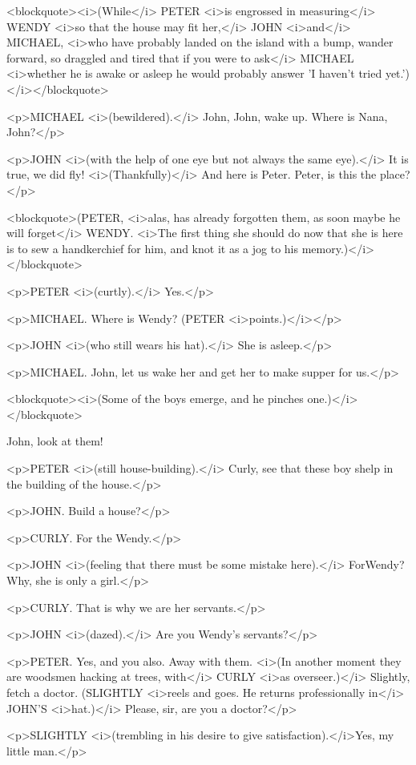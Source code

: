 <blockquote><i>(While</i> PETER <i>is engrossed in measuring</i>
WENDY <i>so that the house may fit her,</i> JOHN <i>and</i> MICHAEL,
<i>who have probably landed on the island with a bump, wander
forward, so draggled and tired that if you were to ask</i> MICHAEL
<i>whether he is awake or asleep he would probably answer 'I haven't
tried yet.')</i></blockquote>

<p>MICHAEL <i>(bewildered).</i> John, John, wake up. Where is Nana,
John?</p>

<p>JOHN <i>(with the help of one eye but not always the same
eye).</i> It is true, we did fly! <i>(Thankfully)</i> And here is
Peter. Peter, is this the place?</p>

<blockquote>(PETER, <i>alas, has already forgotten them, as soon
maybe he will forget</i> WENDY. <i>The first thing she should do now
that she is here is to sew a handkerchief for him, and knot it as a
jog to his memory.)</i></blockquote>

<p>PETER <i>(curtly).</i> Yes.</p>

<p>MICHAEL. Where is Wendy? (PETER <i>points.)</i></p>

<p>JOHN <i>(who still wears his hat).</i> She is asleep.</p>

<p>MICHAEL. John, let us wake her and get her to make supper for
us.</p>

<blockquote><i>(Some of the boys emerge, and he pinches
one.)</i></blockquote>

John, look at them! 

<p>PETER <i>(still house-building).</i> Curly, see that these boy
shelp in the building of the house.</p>

<p>JOHN. Build a house?</p>

<p>CURLY. For the Wendy.</p>

<p>JOHN <i>(feeling that there must be some mistake here).</i>
ForWendy? Why, she is only a girl.</p>

<p>CURLY. That is why we are her servants.</p>

<p>JOHN <i>(dazed).</i> Are you Wendy's servants?</p>

<p>PETER. Yes, and you also. Away with them. <i>(In another moment
they are woodsmen hacking at trees, with</i> CURLY <i>as
overseer.)</i> Slightly, fetch a doctor. (SLIGHTLY <i>reels and goes.
He returns professionally in</i> JOHN'S <i>hat.)</i> Please, sir, are
you a doctor?</p>

<p>SLIGHTLY <i>(trembling in his desire to give
satisfaction).</i>Yes, my little man.</p>

